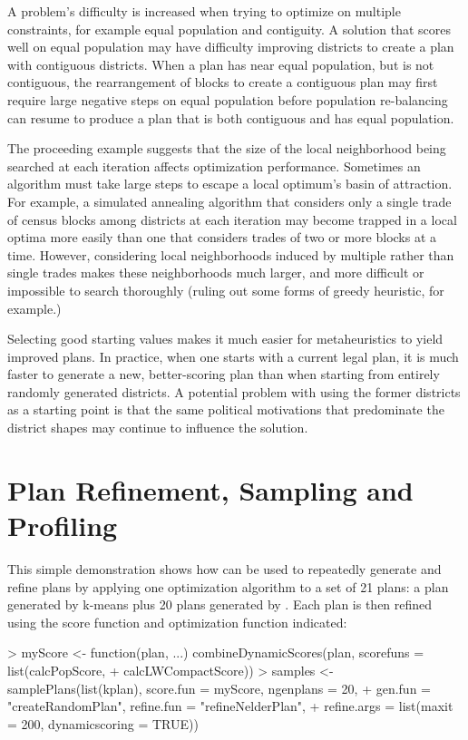 \documentclass[article]{JSSstyle/jss}
\begin{document}
A problem's difficulty is increased when trying to optimize on multiple constraints, for 
example equal population and contiguity. A solution that scores well on equal population may 
have difficulty improving districts to create a plan with contiguous districts.  When a plan has 
near equal population, but is not contiguous, the rearrangement of blocks to create a contiguous plan 
may first require large negative steps on equal population before population re-balancing can resume to
produce a plan that is both contiguous and has equal population.

The proceeding example suggests that the size of the local neighborhood being searched at each iteration affects optimization performance.
Sometimes an algorithm must take large steps to escape a local optimum's basin of attraction. 
For example, a simulated annealing algorithm that considers only a single trade of census blocks among districts at each iteration 
may become trapped in a local optima more easily than one that considers trades of two or more blocks at a time.   However, considering local neighborhoods induced by multiple rather than single trades makes these neighborhoods much larger, and  more difficult or impossible to search thoroughly (ruling out some forms of greedy heuristic, for example.)
	
Selecting good starting values makes it much easier for metaheuristics to yield improved plans.  
In practice, when one starts with a current legal plan, it is much faster to generate a new, better-scoring plan 
than when starting from entirely randomly generated districts.  A potential problem with using the former districts as a starting point is that the same
political motivations that predominate the district shapes may continue to influence the solution.  

\section{Plan Refinement, Sampling and Profiling}

This simple demonstration shows how  can be used to repeatedly generate and refine plans by applying one optimization algorithm to a set of 21 plans: a plan generated by k-means plus 20 plans generated by . Each plan is then refined using the score function and optimization function indicated:

\begin{Schunk}
\begin{Sinput}
> myScore <- function(plan, ...) combineDynamicScores(plan, scorefuns = list(calcPopScore, 
+     calcLWCompactScore))
> samples <- samplePlans(list(kplan), score.fun = myScore, ngenplans = 20, 
+     gen.fun = "createRandomPlan", refine.fun = "refineNelderPlan", 
+     refine.args = list(maxit = 200, dynamicscoring = TRUE))
\end{Sinput}
\end{Schunk}
\end{document}
